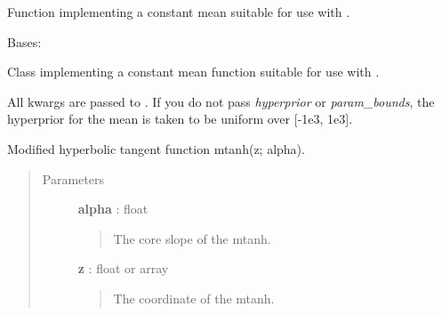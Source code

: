 \documentclass[letterpaper,10pt,english]{sphinxmanual}
\begin{document}
\begin{fulllineitems}
\label{gptools:gptools.mean.constant}
Function implementing a constant mean suitable for use with {\hyperref[gptools:gptools.mean.MeanFunction]{}}.

\end{fulllineitems}


\begin{fulllineitems}
\label{gptools:gptools.mean.ConstantMeanFunction}
Bases: {\hyperref[gptools:gptools.mean.MeanFunction]{}}

Class implementing a constant mean function suitable for use with .

All kwargs are passed to {\hyperref[gptools:gptools.mean.MeanFunction]{}}. If you do not pass
\emph{hyperprior} or \emph{param\_bounds}, the hyperprior for the mean is taken to be
uniform over {[}-1e3, 1e3{]}.

\end{fulllineitems}


\begin{fulllineitems}
\label{gptools:gptools.mean.mtanh}
Modified hyperbolic tangent function mtanh(z; alpha).
\begin{quote}\begin{description}
\item[{Parameters}] \leavevmode
\textbf{alpha} : float
\begin{quote}

The core slope of the mtanh.
\end{quote}

\textbf{z} : float or array
\begin{quote}

The coordinate of the mtanh.
\end{quote}

\end{description}\end{quote}

\end{fulllineitems}
\end{document}
